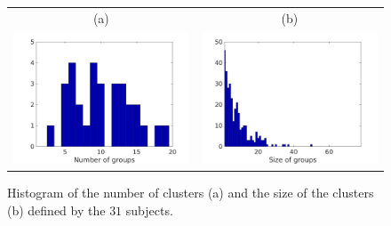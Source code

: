 \documentclass{bmcart}
\begin{document}
\begin{backmatter}
\begin{figure}
\center
\begin{tabular}{cc}
  (a) & (b) \\
  \includegraphics[width = \textwidth]{figures/nbc.png} &
  \includegraphics[width = \textwidth]{figures/sbc.png}
\end{tabular}
\caption{Histogram of the number of clusters (a) and the size of the clusters (b) defined by the $31$ subjects.}
\label{fig:xp2nbSize}
\end{figure}






\end{backmatter}
\end{document}
